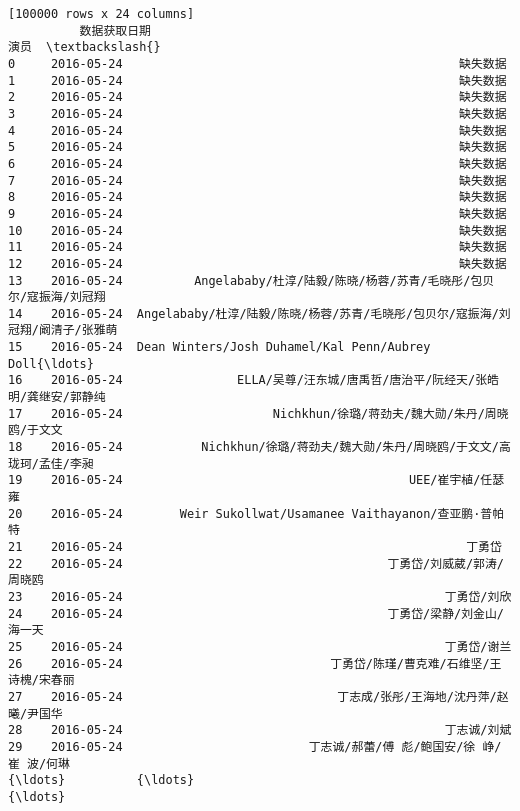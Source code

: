 \documentclass[11pt]{article}
\begin{document}
\begin{Verbatim}[commandchars=\\\{\}]
[100000 rows x 24 columns]
          数据获取日期                                                 演员  \textbackslash{}
0     2016-05-24                                               缺失数据   
1     2016-05-24                                               缺失数据   
2     2016-05-24                                               缺失数据   
3     2016-05-24                                               缺失数据   
4     2016-05-24                                               缺失数据   
5     2016-05-24                                               缺失数据   
6     2016-05-24                                               缺失数据   
7     2016-05-24                                               缺失数据   
8     2016-05-24                                               缺失数据   
9     2016-05-24                                               缺失数据   
10    2016-05-24                                               缺失数据   
11    2016-05-24                                               缺失数据   
12    2016-05-24                                               缺失数据   
13    2016-05-24          Angelababy/杜淳/陆毅/陈晓/杨蓉/苏青/毛晓彤/包贝尔/寇振海/刘冠翔   
14    2016-05-24  Angelababy/杜淳/陆毅/陈晓/杨蓉/苏青/毛晓彤/包贝尔/寇振海/刘冠翔/阚清子/张雅萌   
15    2016-05-24  Dean Winters/Josh Duhamel/Kal Penn/Aubrey Doll{\ldots}   
16    2016-05-24                ELLA/吴尊/汪东城/唐禹哲/唐治平/阮经天/张皓明/龚继安/郭静纯   
17    2016-05-24                     Nichkhun/徐璐/蒋劲夫/魏大勋/朱丹/周晓鸥/于文文   
18    2016-05-24           Nichkhun/徐璐/蒋劲夫/魏大勋/朱丹/周晓鸥/于文文/高珑珂/孟佳/李昶   
19    2016-05-24                                        UEE/崔宇植/任瑟雍   
20    2016-05-24        Weir Sukollwat/Usamanee Vaithayanon/查亚鹏·普帕特   
21    2016-05-24                                                丁勇岱   
22    2016-05-24                                     丁勇岱/刘威葳/郭涛/周晓鸥   
23    2016-05-24                                             丁勇岱/刘欣   
24    2016-05-24                                     丁勇岱/梁静/刘金山/海一天   
25    2016-05-24                                             丁勇岱/谢兰   
26    2016-05-24                             丁勇岱/陈瑾/曹克难/石维坚/王诗槐/宋春丽   
27    2016-05-24                              丁志成/张彤/王海地/沈丹萍/赵曦/尹国华   
28    2016-05-24                                             丁志诚/刘斌   
29    2016-05-24                          丁志诚/郝蕾/傅 彪/鲍国安/徐 峥/崔 波/何琳   
{\ldots}          {\ldots}                                                {\ldots}   

\end{Verbatim}
\end{document}

